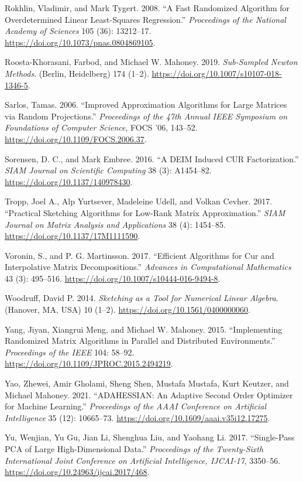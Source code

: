 \documentclass[
  12pt,
]{article}
\newlength{\cslhangindent}
\newenvironment{CSLReferences}[2] %
 {\begin{list}{}{%
  \setlength{\itemindent}{0pt}
  \setlength{\leftmargin}{0pt}
  \setlength{\parsep}{0pt}
  \ifodd #1
   \setlength{\leftmargin}{\cslhangindent}
   \setlength{\itemindent}{-1\cslhangindent}
  \fi
  \setlength{\itemsep}{#2\baselineskip}}}
 {\end{list}}
\begin{document}
\begin{CSLReferences}{1}{1}
Rokhlin, Vladimir, and Mark Tygert. 2008. {``A Fast Randomized Algorithm
for Overdetermined Linear Least-Squares Regression.''} \emph{Proceedings
of the National Academy of Sciences} 105 (36): 13212--17.
\url{https://doi.org/10.1073/pnas.0804869105}.

Roosta-Khorasani, Farbod, and Michael W. Mahoney. 2019.
\emph{Sub-Sampled Newton Methods}. (Berlin, Heidelberg) 174 (1--2).
\url{https://doi.org/10.1007/s10107-018-1346-5}.

Sarlos, Tamas. 2006. {``Improved Approximation Algorithms for Large
Matrices via Random Projections.''} \emph{Proceedings of the 47th Annual
IEEE Symposium on Foundations of Computer Science}, FOCS '06, 143--52.
\url{https://doi.org/10.1109/FOCS.2006.37}.

Sorensen, D. C., and Mark Embree. 2016. {``A DEIM Induced CUR
Factorization.''} \emph{SIAM Journal on Scientific Computing} 38 (3):
A1454--82. \url{https://doi.org/10.1137/140978430}.

Tropp, Joel A., Alp Yurtsever, Madeleine Udell, and Volkan Cevher. 2017.
{``Practical Sketching Algorithms for Low-Rank Matrix Approximation.''}
\emph{SIAM Journal on Matrix Analysis and Applications} 38 (4):
1454--85. \url{https://doi.org/10.1137/17M1111590}.

Voronin, S., and P. G. Martinsson. 2017. {``Efficient Algorithms for Cur
and Interpolative Matrix Decompositions.''} \emph{Advances in
Computational Mathematics} 43 (3): 495--516.
\url{https://doi.org/10.1007/s10444-016-9494-8}.

Woodruff, David P. 2014. \emph{Sketching as a Tool for Numerical Linear
Algebra}. (Hanover, MA, USA) 10 (1--2).
\url{https://doi.org/10.1561/0400000060}.

Yang, Jiyan, Xiangrui Meng, and Michael W. Mahoney. 2015.
{``Implementing Randomized Matrix Algorithms in Parallel and Distributed
Environments.''} \emph{Proceedings of the IEEE} 104: 58--92.
\url{https://doi.org/10.1109/JPROC.2015.2494219}.

Yao, Zhewei, Amir Gholami, Sheng Shen, Mustafa Mustafa, Kurt Keutzer,
and Michael Mahoney. 2021. {``ADAHESSIAN: An Adaptive Second Order
Optimizer for Machine Learning.''} \emph{Proceedings of the AAAI
Conference on Artificial Intelligence} 35 (12): 10665--73.
\url{https://doi.org/10.1609/aaai.v35i12.17275}.

Yu, Wenjian, Yu Gu, Jian Li, Shenghua Liu, and Yaohang Li. 2017.
{``Single-Pass PCA of Large High-Dimensional Data.''} \emph{Proceedings
of the Twenty-Sixth International Joint Conference on Artificial
Intelligence, {IJCAI-17}}, 3350--56.
\url{https://doi.org/10.24963/ijcai.2017/468}.

\end{CSLReferences}
\end{document}
